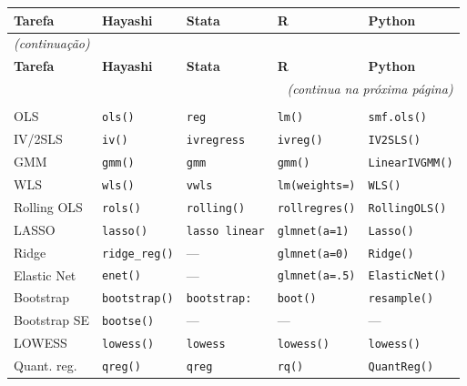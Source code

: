 {\footnotesize\setlength{\tabcolsep}{3pt}%
\begin{longtable}{lllll}
\toprule
\textbf{Tarefa} & \textbf{Hayashi} & \textbf{Stata} & \textbf{R} & \textbf{Python} \\
\midrule
\endfirsthead
\multicolumn{5}{l}{\footnotesize\itshape (continuação)} \\[2pt]
\toprule
\textbf{Tarefa} & \textbf{Hayashi} & \textbf{Stata} & \textbf{R} & \textbf{Python} \\
\midrule
\endhead
\midrule
\multicolumn{5}{r}{\footnotesize\itshape (continua na próxima página)} \\
\endfoot
\bottomrule
\endlastfoot
%
\multicolumn{5}{l}{\textit{Regressão}} \\
OLS             & \texttt{ols()}        & \texttt{reg}          & \texttt{lm()}          & \texttt{smf.ols()} \\
IV/2SLS         & \texttt{iv()}         & \texttt{ivregress}    & \texttt{ivreg()}       & \texttt{IV2SLS()} \\
GMM             & \texttt{gmm()}        & \texttt{gmm}          & \texttt{gmm()}         & \texttt{LinearIVGMM()} \\
WLS             & \texttt{wls()}        & \texttt{vwls}         & \texttt{lm(weights=)}  & \texttt{WLS()} \\
Rolling OLS     & \texttt{rols()}       & \texttt{rolling()}    & \texttt{rollregres()}  & \texttt{RollingOLS()} \\
LASSO           & \texttt{lasso()}      & \texttt{lasso linear} & \texttt{glmnet(a=1)}   & \texttt{Lasso()} \\
Ridge           & \texttt{ridge\_reg()} & —                     & \texttt{glmnet(a=0)}   & \texttt{Ridge()} \\
Elastic Net     & \texttt{enet()}       & —                     & \texttt{glmnet(a=.5)}  & \texttt{ElasticNet()} \\
Bootstrap       & \texttt{bootstrap()}  & \texttt{bootstrap:}   & \texttt{boot()}        & \texttt{resample()} \\
Bootstrap SE    & \texttt{bootse()}     & —                     & —                      & —                     \\
LOWESS          & \texttt{lowess()}     & \texttt{lowess}       & \texttt{lowess()}      & \texttt{lowess()} \\
Quant. reg.     & \texttt{qreg()}       & \texttt{qreg}         & \texttt{rq()}          & \texttt{QuantReg()} \\

\end{longtable}}

